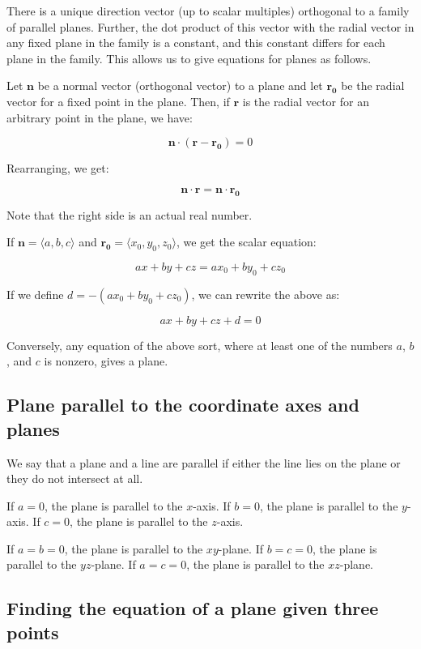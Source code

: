 \documentclass[10pt]{amsart}
\begin{document}
There is a unique direction vector (up to scalar multiples) orthogonal
to a family of parallel planes. Further, the dot product of this
vector with the radial vector in any fixed plane in the family is a
constant, and this constant differs for each plane in the family. This
allows us to give equations for planes as follows.

Let $\mathbf{n}$ be a normal vector (orthogonal vector) to a plane and
let $\mathbf{r_0}$ be the radial vector for a fixed point in the
plane. Then, if $\mathbf{r}$ is the radial vector for an arbitrary
point in the plane, we have:

$$\mathbf{n} \cdot (\mathbf{r} - \mathbf{r_0}) = 0$$

Rearranging, we get:

$$\mathbf{n} \cdot \mathbf{r} = \mathbf{n} \cdot \mathbf{r_0}$$

Note that the right side is an actual real number.

If $\mathbf{n} = \langle a,b,c \rangle$ and $\mathbf{r_0} = \langle
x_0,y_0,z_0 \rangle$, we get the scalar equation:

$$ax + by + cz = ax_0 + by_0 + cz_0$$

If we define $d = -(ax_0 + by_0 + cz_0)$, we can rewrite the above as:

$$ax + by + cz + d = 0$$

Conversely, any equation of the above sort, where at least one of the
numbers $a$, $b$, and $c$ is nonzero, gives a plane.

\subsection{Plane parallel to the coordinate axes and planes}

We say that a plane and a line are parallel if either the line lies on
the plane or they do not intersect at all.

If $a = 0$, the plane is parallel to the $x$-axis. If $b = 0$, the
plane is parallel to the $y$-axis. If $c = 0$, the plane is parallel
to the $z$-axis.

If $a = b = 0$, the plane is parallel to the $xy$-plane. If $b = c =
0$, the plane is parallel to the $yz$-plane. If $a = c = 0$, the plane
is parallel to the $xz$-plane.

\subsection{Finding the equation of a plane given three points}
\end{document}

